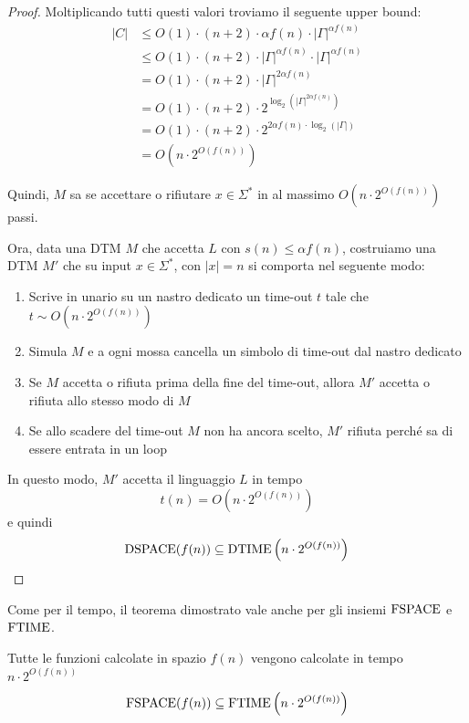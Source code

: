 \begin{proof}
	Moltiplicando tutti questi valori troviamo il seguente upper bound: 
	\begin{align*}
		|C| & \leq O(1) \cdot (n + 2) \cdot \alpha f (n) \cdot |\Gamma|^{\alpha f (n)} \\
		& \leq O(1) \cdot (n + 2) \cdot |\Gamma|^{\alpha f(n)} \cdot |\Gamma|^{\alpha f(n)} \\
		& = O(1) \cdot (n + 2) \cdot |\Gamma|^{2 \alpha f (n)} \\
		& = O(1) \cdot (n + 2) \cdot 2^{\log_2 \left(|\Gamma|^{2 \alpha f(n)}\right)} \\
		& = O(1) \cdot (n + 2) \cdot 2^{2 \alpha f(n) \cdot \log_2 \left(|\Gamma|\right)} \\
		& = O \left(n \cdot 2^{O(f(n))}\right)
	\end{align*}
    
	Quindi, $M$ sa se accettare o rifiutare $x \in \Sigma^\ast$ in al massimo $O\left(n \cdot 2^{O(f(n))}\right)$ passi.
	
	Ora, data una DTM $M$ che accetta $L$ con $s(n) \leq \alpha f(n)$, costruiamo una DTM $M'$ che su input $x \in \Sigma^\ast$, con $|x| = n$ si comporta nel seguente modo:
	\begin{enumerate}
		\item Scrive in unario su un nastro dedicato un time-out $t$ tale che $t \sim O\left(n \cdot 2^{O(f(n))}\right)$
		
        \item Simula $M$ e a ogni mossa cancella un simbolo di time-out dal nastro dedicato
		
        \item Se $M$ accetta o rifiuta prima della fine del time-out, allora $M'$ accetta o rifiuta allo stesso modo di $M$
		
        \item Se allo scadere del time-out $M$ non ha ancora scelto, $M'$ rifiuta perché sa di essere entrata in un loop
	\end{enumerate} 
	
	In questo modo, $M'$ accetta il linguaggio $L$ in tempo
	$$ t(n) = O \left(n \cdot 2^{O(f(n))}\right) $$
	e quindi 
	$$ \text{DSPACE}(f(n)) \subseteq \text{DTIME} \left(n \cdot 2^{O(f(n))}\right) $$
\end{proof}

Come per il tempo, il teorema dimostrato vale anche per gli insiemi $\text{FSPACE}$ e $\text{FTIME}$.\\

\begin{theor}
	Tutte le funzioni calcolate in spazio $f(n)$ vengono calcolate in tempo $n \cdot 2^{O(f(n))}$
	$$ \text{FSPACE} (f(n)) \subseteq \text{FTIME} \left(n \cdot 2^{O(f(n))}\right)$$
\end{theor}

